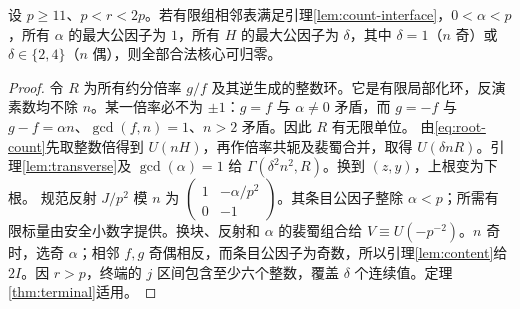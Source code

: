 \begin{corollary}\label{cor:resource}
设 $p\ge11$、$p<r<2p$。若有限组相邻表满足引理\ref{lem:count-interface}，$0<\alpha<p$，所有 $\alpha$ 的最大公因子为 $1$，所有 $H$ 的最大公因子为 $\delta$，其中 $\delta=1$（$n$ 奇）或 $\delta\in\{2,4\}$（$n$ 偶），则全部合法核心可归零。
\end{corollary}
\begin{proof}
令 $R$ 为所有约分倍率 $g/f$ 及其逆生成的整数环。它是有限局部化环，反演素数均不除 $n$。某一倍率必不为 $\pm1$：$g=f$ 与 $\alpha\ne0$ 矛盾，而 $g=-f$ 与 $g-f=\alpha n$、$\gcd(f,n)=1$、$n>2$ 矛盾。因此 $R$ 有无限单位。
由\eqref{eq:root-count}先取整数倍得到 $U(nH)$，再作倍率共轭及裴蜀合并，取得 $U(\delta nR)$。引理\ref{lem:transverse}及 $\gcd(\alpha)=1$ 给 $\Gamma(\delta^2n^2,R)$。换到 $(z,y)$，上根变为下根。
规范反射 $J/p^2$ 模 $n$ 为 $\left(\begin{smallmatrix}1&-\alpha/p^2\\0&-1\end{smallmatrix}\right)$。其条目公因子整除 $\alpha<p$；所需有限标量由安全小数字提供。换块、反射和 $\alpha$ 的裴蜀组合给 $V\equiv U(-p^{-2})$。$n$ 奇时，选奇 $\alpha$；相邻 $f,g$ 奇偶相反，而条目公因子为奇数，所以引理\ref{lem:content}给 $2I$。因 $r>p$，终端的 $j$ 区间包含至少六个整数，覆盖 $\delta$ 个连续值。定理\ref{thm:terminal}适用。
\end{proof}

